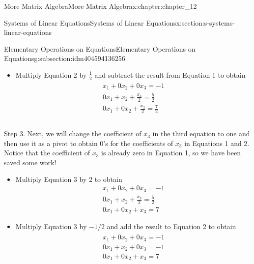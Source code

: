 \documentclass[twoside,10pt,]{book}
\numberwithin{equation}{section}
\begin{document}
\begin{chapterptx}{More Matrix Algebra}{}{More Matrix Algebra}{}{}{x:chapter:chapter_12}
\begin{sectionptx}{Systems of Linear Equations}{}{Systems of Linear Equations}{}{}{x:section:s-systems-linear-equations}
\begin{subsectionptx}{Elementary Operations on Equations}{}{Elementary Operations on Equations}{}{}{g:subsection:idm404594136256}
\begin{itemize}[label=\textbullet]
\begin{gather}
\begin{array}{c}
x_1+\frac{x_2}{2}+\frac{x_3}{4}=\frac{1}{4} \\
0 x_1+  x_2+ \frac{x_3}{2}=\frac{5}{2} \\
0 x_1 + 0 x_2+ \frac{x_3}{2}=\frac{7}{2} \\\\
\end{array}\label{g:mrow:idm404594117472}
\end{gather}
%
\item{}Multiply Equation 2 by \(\frac{1}{2}\) and subtract the result from Equation 1 to obtain%
\begin{gather}
\begin{array}{c}
x_1+ 0x_2 + 0x_3 = -1 \\
0 x_1+  x_2+ \frac{x_3}{2}=\frac{5}{2} \\
0 x_1 + 0 x_2+ \frac{x_3}{2}=\frac{7}{2} \\\\
\end{array}\label{g:mrow:idm404594115856}
\end{gather}
%
\end{itemize}
%
\par
Step 3. Next, we will change the coefficient of \(x_3\) in the third equation to one and then use it as a pivot to obtain 0's for the coefficients of \(x_3\) in Equations 1 and 2. Notice that the coefficient of \(x_3\) is already zero in Equation 1, so we have been saved some work!%
\begin{itemize}[label=\textbullet]
\item{}Multiply Equation 3 by \(2\) to obtain%
\begin{equation*}
\begin{array}{c}
x_1+ 0x_2 + 0x_3 = -1 \\
0 x_1+  x_2+ \frac{x_3}{2}=\frac{5}{2} \\
0 x_1 + 0 x_2+ x_3=7 
\end{array}
\end{equation*}
%
\item{}Multiply Equation 3 by \(-1/2\) and add the result to Equation 2 to obtain%
\begin{gather}
\begin{array}{c}
x_1+ 0x_2 + 0x_3 = -1 \\
0 x_1+  x_2+ 0 x_3=-1 \\
0 x_1 + 0 x_2+ x_3=7 \\
\end{array}\label{x:mrow:sys-12-1-final-system}

\end{gather}
\end{itemize}
\end{subsectionptx}
\end{sectionptx}
\end{chapterptx}
\end{document}
